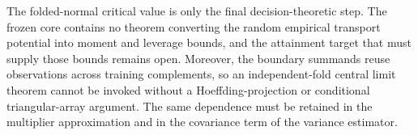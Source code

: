 The folded-normal critical value is only the final decision-theoretic step. The frozen core contains no theorem converting the random empirical transport potential into moment and leverage bounds, and the attainment target that must supply those bounds remains open. Moreover, the boundary summands reuse observations across training complements, so an independent-fold central limit theorem cannot be invoked without a Hoeffding-projection or conditional triangular-array argument. The same dependence must be retained in the multiplier approximation and in the covariance term of the variance estimator.